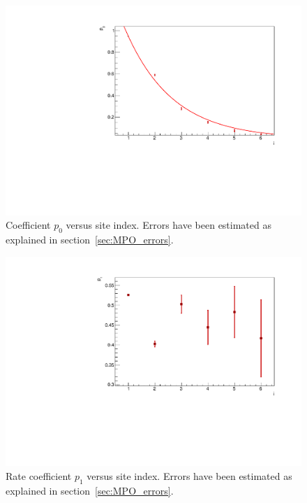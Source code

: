 \begin{figure}[H]
    \centering
    \captionsetup{width=1.\linewidth}
    \includegraphics[scale=0.6]{Figures/16sites_p0VsSiteIndex.pdf}
    \caption{Coefficient $p_0$ versus site index. Errors have been estimated as explained in section~\ref{sec:MPO_errors}.}
    \label{fig:16sites_p1VSsiteIndex}
\end{figure}


\begin{figure}[H]
    \centering
    \captionsetup{width=1.\linewidth}
    \includegraphics[scale=0.6]{Figures/16sites_p1VSsiteIndex.pdf}
    \caption{Rate coefficient $p_1$ versus site index. Errors have been estimated as explained in section~\ref{sec:MPO_errors}.}
    \label{fig:16sites_p0VSsiteIndex}
\end{figure}

